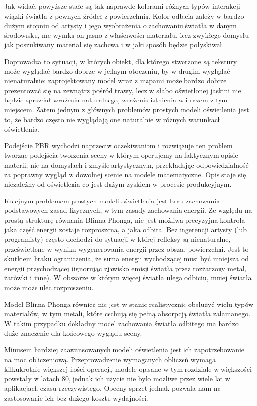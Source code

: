 \documentclass[../main.tex]{subfiles}
\begin{document}
Jak widać, powyższe stałe są tak naprawde kolorami różnych typów interakcji
wiązki światła z pewnych źródeł z powierzchnią. Kolor odbicia zależy w bardzo
dużym stopniu od artysty i jego wyobrażenia o zachowaniu światła w danym
środowisku, nie wynika on jasno z właściwości materiału, lecz zwykłego domysłu
jak poszukiwany materiał się zachowa i w jaki sposób będzie połyskiwał.

Doprowadza to sytuacji, w których obiekt, dla którego stworzone są tekstury
może wyglądać bardzo dobrze w jednym otoczeniu, by w drugim wyglądać
nienaturalnie: zaprojektowany model wraz z mapami może bardzo dobrze
prezentować się na zewnątrz pośród trawy, lecz w słabo oświetlonej jaskini nie
będzie sprawiał wrażenia naturalnego, wrażenia istnienia w i razem z tym
miejscem. Zatem jednym z głównych problemów prostych modeli oświetlenia jest
to, że bardzo często nie wyglądają one naturalnie w różnych warunkach
oświetlenia.

Podejście PBR wychodzi naprzeciw oczekiwaniom i rozwiązuje ten problem tworząc
podejścia tworzenia sceny w którym operujemy na faktycznym opisie materii, nie
na domysłach i zmyśle artystycznym, przekładając odpowiedzialność za poprawny
wygląd w dowolnej scenie na modele matematyczne. Opis staje się niezależny od
oświetlenia co jest dużym zyskiem w procesie produkcyjnym.

Kolejnym problemem prostych modeli oświetlenia jest brak zachowania
podstawowych zasad fizycznych, w tym zasady zachowania energii. Ze względu na
prostą strukturę równania Blinna-Phonga, nie jest możliwa precyzyjna kontrola
jaka część energii zostaje rozproszona, a jaka odbita. Bez ingerencji artysty
(lub programisty) często dochodzi do sytuacji w której refleksy są
nienaturalne, prześwietlone w wyniku wygenerowania energii przez obszar
powierzchni. Jest to skutkiem braku ograniczenia, że suma energii wychodzącej
musi być mniejsza od energii przychodzącej (ignorując zjawisko emisji światła
przez rozżarzony metal, żarówki i inne). W obszarze w którym więcej światła
ulega odbiciu, mniej światła może może ulec rozproszeniu.

Model Blinna-Phonga również nie jest w stanie realistycznie obsłużyć wielu
typów materiałów, w tym metali, które cechują się pełną absorpcją światła
załamanego. W takim przypadku dokładny model zachowania światła odbitego ma
bardzo duże znaczenie dla końcowego wyglądu sceny.

Minusem bardziej zaawansowanych modeli oświetlenia jest ich zapotrzebowanie na
moc obliczeniową. Przeprowadzenie wymaganych obliczeń wymaga kilkukrotnie
większej ilości operacji, modele opisane w tym rozdziale w większości powstały
w latach 80, jednak ich użycie nie było możliwe przez wiele lat w aplikacjach
czasu rzeczywistego. Obecny sprzet jednak pozwala nam na zastosowanie ich bez
dużego kosztu wydajności.
\end{document}

